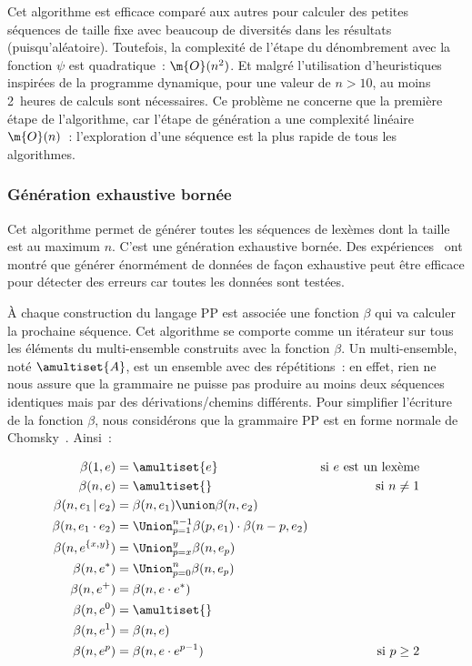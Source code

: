 Cet algorithme est efficace comparé aux autres pour calculer des petites
séquences de taille fixe avec beaucoup de diversités dans les résultats
(puisqu'aléatoire). Toutefois, la complexité de l'étape du dénombrement avec la
fonction $\psi$ est quadratique~: $\m{O}(n^2)$. Et malgré l'utilisation
d'heuristiques inspirées de la programme dynamique, pour une valeur de $n > 10$,
au moins 2~heures de calculs sont nécessaires. Ce problème ne concerne que la
première étape de l'algorithme, car l'étape de génération a une complexité
linéaire $\m{O}(n)$~: l'exploration d'une séquence est la plus rapide de tous
les algorithmes.

\subsubsection{Génération exhaustive bornée}
\label{subsection:data:bounded_exhaustive_generation}

Cet algorithme permet de générer toutes les séquences de lexèmes dont la taille
est au maximum $n$. C'est une génération exhaustive bornée. Des
expériences~ ont montré que générer énormément
de données de façon exhaustive peut être efficace pour détecter des erreurs car
toutes les données sont testées.

À chaque construction du langage PP est associée une fonction $\beta$ qui va
calculer la prochaine séquence. Cet algorithme se comporte comme un itérateur
sur tous les éléments du multi-ensemble construits avec la fonction $\beta$. Un
multi-ensemble, noté $\amultiset{A}$, est un ensemble avec des répétitions~: en
effet, rien ne nous assure que la grammaire ne puisse pas produire au moins deux
séquences identiques mais par des dérivations/chemins différents. Pour
simplifier l'écriture de la fonction $\beta$, nous considérons que la grammaire
PP est en forme normale de Chomsky~. Ainsi~:

\begin{align*}
%
\beta(1, e) & =
    \amultiset{e}
    &
    \text{si $e$ est un lexème}
    \\
%
\beta(n, e) & =
    \amultiset{}
    &
    \text{si $n \neq 1$}
    \\
%
\beta(n, e_1 \,\vert\, e_2) & =
    \beta(n, e_1) \union \beta(n, e_2)
    \\
%
\beta(n, e_1 \cdot e_2) & =
    \Union_{p = 1}^{n - 1}
    \beta(p, e_1) \cdot \beta(n - p, e_2)
    \\
%
\beta(n, e^{\{x, y\}}) & =
    \Union_{p = x}^y \beta(n, e_p)
    \\
%
\beta(n, e^*) & =
    \Union_{p = 0}^n \beta(n, e_p)
    \\
%
\beta(n, e^+) & =
    \beta(n, e \cdot e^*)
    \\
%
\beta(n, e^0) & =
    \amultiset{}
    \\
%
\beta(n, e^1) & =
    \beta(n, e)
    \\
%
\beta(n, e^p) & =
    \beta(n, e \cdot e^{p - 1})
    &
    \text{si $p \geq 2$}
%
\end{align*}

